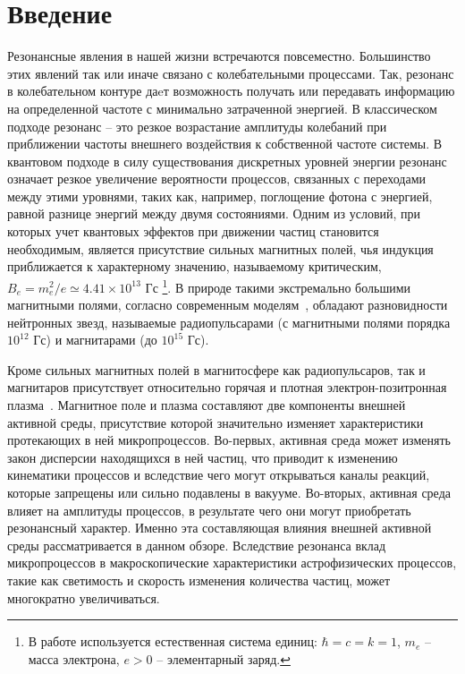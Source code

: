 \section{Введение}
Резонансные явления в нашей жизни встречаются повсеместно. Большинство этих явлений так или иначе связано с колебательными процессами. Так, резонанс в колебательном контуре даeт возможность получать или передавать информацию 
на определенной частоте с минимально затраченной энергией. В классическом подходе резонанс -- это резкое возрастание амплитуды колебаний при приближении частоты внешнего воздействия к собственной частоте системы. В квантовом подходе в силу существования дискретных уровней энергии резонанс означает резкое увеличение вероятности процессов, связанных с переходами между этими уровнями, таких как, например, поглощение фотона с энергией, равной разнице энергий между двумя состояниями. Одним из условий, при которых учет квантовых эффектов при движении частиц становится необходимым, является присутствие сильных магнитных полей, чья индукция приближается к характерному значению, называемому критическим, $B_e = m_e^2 / e \simeq 4.41 \times 10^{13}$ Гс \footnote{В работе используется естественная система единиц: $\hbar = c = k = 1$, $m_e$ -- масса электрона, $e > 0$ --  элементарный заряд.}. В природе такими экстремально большими магнитными полями, согласно современным моделям~\cite{Duncan:1995,Thompson:1996,Thompson:2002}, обладают разновидности нейтронных звезд, называемые радиопульсарами (с магнитными полями порядка $10^{12}$ Гс) и магнитарами (до $10^{15}$ Гс).

Кроме сильных магнитных полей в магнитосфере как радиопульсаров, так и магнитаров присутствует относительно горячая и плотная электрон-позитронная плазма~\cite{Duncan:1995}. Магнитное поле и плазма составляют 
две компоненты внешней активной среды, присутствие которой значительно изменяет характеристики протекающих в ней микропроцессов. Во-первых, активная среда может изменять закон дисперсии 
находящихся в ней частиц, что приводит к изменению кинематики процессов и вследствие чего могут открываться  каналы реакций, которые запрещены или сильно подавлены в вакууме. Во-вторых, активная среда 
влияет на амплитуды процессов, в результате чего они могут приобретать резонансный характер. Именно эта составляющая влияния внешней активной среды рассматривается в данном обзоре. 
Вследствие резонанса вклад микропроцессов в макроскопические характеристики астрофизических процессов, такие как светимость и скорость изменения количества частиц, может 
многократно увеличиваться.

